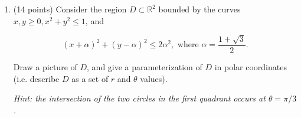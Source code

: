 \documentclass[12 pt]{report}
\begin{document}
\begin{enumerate}
\newpage


\item (14 points) Consider the region $D \subset \mathbb{R}^2$ bounded by the curves $x,y \geq 0, x^2 + y^2 \leq 1$, and

\[
\left(x + \alpha \right)^2 + \left(y - \alpha \right)^2 \leq 2\alpha^2, \text{ where } \alpha = \frac{1 + \sqrt{3}}{2}.
\]

Draw a picture of $D$, and give a parameterization of $D$ in polar coordinates (i.e. describe $D$ as a set of $r$ and $\theta$ values). 

\medskip

\textit{Hint: the intersection of the two circles in the first quadrant occurs at $\theta = \pi/3$.}


%
%
%
%
%
%
%

\end{enumerate}
\end{document}

